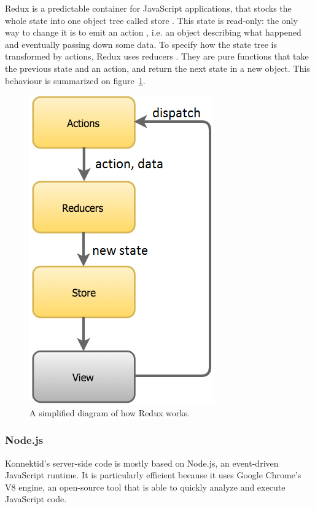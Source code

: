Redux is a predictable container for JavaScript applications, that stocks the whole state into one object tree called \guillemotleft{} store \guillemotright{}.
This state is read-only: the only way to change it is to emit an \guillemotleft{} action \guillemotright{}, i.e. an object describing what happened and eventually
passing down some data. To specify how the state tree is transformed by actions, Redux uses \guillemotleft{} reducers \guillemotright{}. They are pure functions
that take the previous state and an action, and return the next state in a new object. This behaviour is summarized on {\sc figure}~\ref{fig:reduxSumup}.

\begin{figure}[H]
    \centering
    \includegraphics[scale=0.7]{figure/redux_flow.png}
    \caption{A simplified diagram of how Redux works.}
    \label{fig:reduxSumup}
\end{figure}

\subsubsection{Node.js}
\label{sssec:node}

Konnektid's server-side code is mostly based on Node.js, an event-driven JavaScript runtime. It is particularly efficient because it uses Google Chrome's V8 engine,
an open-source tool that is able to quickly analyze and execute JavaScript code.

